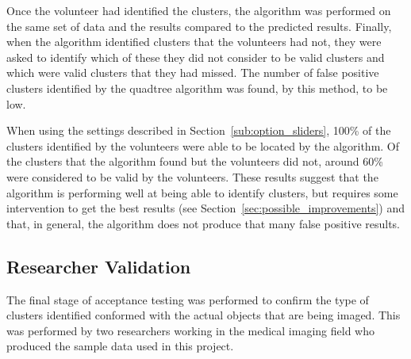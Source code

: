 Once the volunteer had identified the clusters, the algorithm was performed on
the same set of data and the results compared to the predicted results.
Finally, when the algorithm identified clusters that the volunteers had not,
they were asked to identify which of these they did not consider to be valid
clusters and which were valid clusters that they had missed. The number of
false positive clusters identified by the quadtree algorithm was found, by this
method, to be low.

When using the settings described in Section~\ref{sub:option_sliders}, 100\% of
the clusters identified by the volunteers were able to be located by the
algorithm. Of the clusters that the algorithm found but the volunteers did not,
around 60\% were considered to be valid by the volunteers. These results
suggest that the algorithm is performing well at being able to identify
clusters, but requires some intervention to get the best results (see
Section~\ref{sec:possible_improvements}) and that, in general, the algorithm
does not produce that many false positive results.

\subsection{Researcher Validation}
\label{sub:researcher_validation}

The final stage of acceptance testing was performed to confirm the type of
clusters identified conformed with the actual objects that are being imaged.
This was performed by two researchers working in the medical imaging field who
produced the sample data used in this project.
